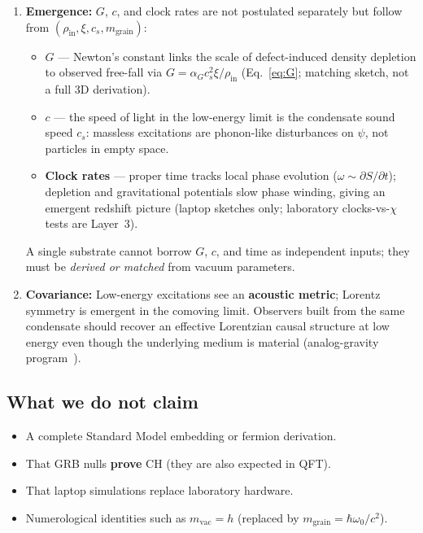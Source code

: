 \documentclass[11pt,a4paper]{article}
\begin{document}
\begin{enumerate}[label=\textbf{\arabic*.}, leftmargin=*]
  \item \textbf{Emergence:} $G$, $c$, and clock rates are not postulated separately but follow from $(\rho_{\mathrm{in}}, \xi, c_s, m_{\mathrm{grain}})$:
  \begin{itemize}[nosep,leftmargin=1.5em]
    \item \textbf{$G$} --- Newton's constant links the scale of defect-induced density depletion to observed free-fall via $G = \alpha_G c_s^2 \xi / \rho_{\mathrm{in}}$ (Eq.~\ref{eq:G}; matching sketch, not a full 3D derivation).
    \item \textbf{$c$} --- the speed of light in the low-energy limit is the condensate sound speed $c_s$: massless excitations are phonon-like disturbances on $\psi$, not particles in empty space.
    \item \textbf{Clock rates} --- proper time tracks local phase evolution ($\omega \sim \partial S/\partial t$); depletion and gravitational potentials slow phase winding, giving an emergent redshift picture (laptop sketches only; laboratory clocks-vs-$\chi$ tests are Layer~3).
  \end{itemize}
  A single substrate cannot borrow $G$, $c$, and time as independent inputs; they must be \emph{derived or matched} from vacuum parameters.

  \item \textbf{Covariance:} Low-energy excitations see an \textbf{acoustic metric}; Lorentz symmetry is emergent in the comoving limit.
  Observers built from the same condensate should recover an effective Lorentzian causal structure at low energy even though the underlying medium is material (analog-gravity program~\cite{Unruh1981,Visser1995}).
\end{enumerate}

\subsection{What we do not claim}

\begin{itemize}[leftmargin=*]
  \item A complete Standard Model embedding or fermion derivation.
  \item That GRB nulls \textbf{prove} CH (they are also expected in QFT).
  \item That laptop simulations replace laboratory hardware.
  \item Numerological identities such as $m_{\mathrm{vac}} = h$ (replaced by $m_{\mathrm{grain}} = \hbar\omega_0/c^2$).
\end{itemize}
\end{document}
